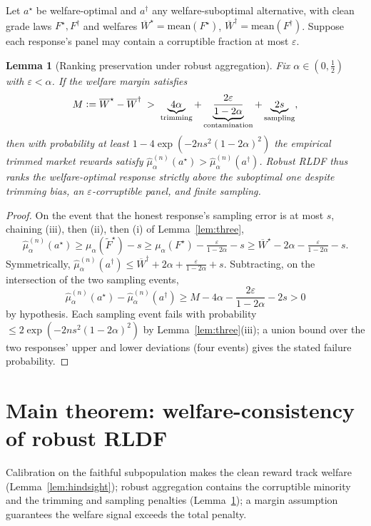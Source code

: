 \documentclass[11pt]{article}
\theoremstyle{plain}
\newtheorem{lemma}{Lemma}
\theoremstyle{definition}
\theoremstyle{remark}
\newcommand{\Wbar}{\overline{W}}
\newcommand{\eps}{\varepsilon}
\newcommand{\defeq}{\vcentcolon=}
\begin{document}
Let $a^\star$ be welfare-optimal and $a^\dagger$ any welfare-suboptimal alternative, with
clean grade laws $F^\star,F^\dagger$ and welfares $\Wbar^\star=\mathrm{mean}(F^\star)$,
$\Wbar^\dagger=\mathrm{mean}(F^\dagger)$. Suppose each response's panel may contain a
corruptible fraction at most $\eps$.

\begin{lemma}[Ranking preservation under robust aggregation]
\label{lem:rank}
Fix $\alpha\in(0,\tfrac12)$ with $\eps<\alpha$. If the welfare margin satisfies
\[
  M\defeq\Wbar^\star-\Wbar^\dagger\;>\;\underbrace{4\alpha}_{\text{trimming}}
  +\underbrace{\frac{2\eps}{1-2\alpha}}_{\text{contamination}}
  +\underbrace{2s}_{\text{sampling}},
\]
then with probability at least $1-4\exp(-2ns^2(1-2\alpha)^2)$ the empirical trimmed market
rewards satisfy $\hat\mu_\alpha^{(n)}(a^\star)>\hat\mu_\alpha^{(n)}(a^\dagger)$. Robust RLDF
thus ranks the welfare-optimal response strictly above the suboptimal one despite trimming
bias, an $\eps$-corruptible panel, and finite sampling.
\end{lemma}

\begin{proof}
On the event that the honest response's sampling error is at most $s$, chaining (iii), then
(ii), then (i) of Lemma~\ref{lem:three},
\[
  \hat\mu_\alpha^{(n)}(a^\star)
  \ge\mu_\alpha(\tilde F^\star)-s
  \ge\mu_\alpha(F^\star)-\tfrac{\eps}{1-2\alpha}-s
  \ge\Wbar^\star-2\alpha-\tfrac{\eps}{1-2\alpha}-s .
\]
Symmetrically, $\hat\mu_\alpha^{(n)}(a^\dagger)\le\Wbar^\dagger+2\alpha+\tfrac{\eps}{1-2\alpha}+s$.
Subtracting, on the intersection of the two sampling events,
\[
  \hat\mu_\alpha^{(n)}(a^\star)-\hat\mu_\alpha^{(n)}(a^\dagger)
  \ge M-4\alpha-\frac{2\eps}{1-2\alpha}-2s>0
\]
by hypothesis. Each sampling event fails with probability $\le 2\exp(-2ns^2(1-2\alpha)^2)$ by
Lemma~\ref{lem:three}(iii); a union bound over the two responses' upper and lower deviations
(four events) gives the stated failure probability.
\end{proof}


\section{Main theorem: welfare-consistency of robust RLDF}
\label{sec:mainthm}

Calibration on the faithful subpopulation makes the clean reward track welfare
(Lemma~\ref{lem:hindsight}); robust aggregation contains the corruptible minority and the
trimming and sampling penalties (Lemma~\ref{lem:rank}); a margin assumption guarantees the
welfare signal exceeds the total penalty.
\end{document}
